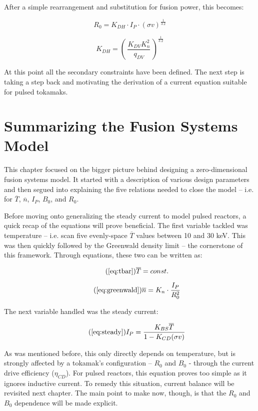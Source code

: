 After a simple rearrangement and substitution for fusion power, this becomes:

\begin{equation}
	R_0 = K_{DH} \cdot I_P \cdot (\sigma v)^ {\frac{1}{3.2}} 
\end{equation}

\begin{equation}
	K_{DH} = \left( \, \frac{ K_{DV} K_n^2 }{ q_{DV} } \, \right) ^ {\frac{1}{3.2}}
\end{equation}

At this point all the secondary constraints have been defined. The next step is taking a step back and motivating the derivation of a current equation suitable for pulsed tokamaks.

\section{Summarizing the Fusion Systems Model}

This chapter focused on the bigger picture behind designing a zero-dimensional fusion systems model. It started with a description of various design parameters and then segued into explaining the five relations needed to close the model -- i.e. for $\overline T$, $\overline n$, $I_P$, $B_0$, and $R_0$.

Before moving onto generalizing the steady current to model pulsed reactors, a quick recap of the equations will prove beneficial. The first variable tackled was temperature -- i.e. scan five evenly-space $\overline T$ values between 10 and 30 keV. This was then quickly followed by the Greenwald density limit -- the cornerstone of this framework. Through equations, these two can be written as:

\begin{equation}
	\tag{\ref{eq:tbar}}
	\overline T = const.
\end{equation}

\begin{equation}
	\tag{\ref{eq:greenwald}}
	\overline n = K_n \cdot \frac{I_P}{R_0^2}
\end{equation}

The next variable handled was the steady current:

\begin{equation}
	\tag{\ref{eq:steady}}
	I_P = \frac{K_{BS} \overline T}{1 - K_{CD} ( \sigma v ) }
\end{equation}

As was mentioned before, this only directly depends on temperature, but is strongly affected by a tokamak's configuration -- $R_0$ and $B_0$ - through the current drive efficiency ($\eta_{CD}$). For pulsed reactors, this equation proves too simple as it ignores inductive current. To remedy this situation, current balance will be revisited next chapter. The main point to make now, though, is that the $R_0$ and $B_0$ dependence will be made explicit.

